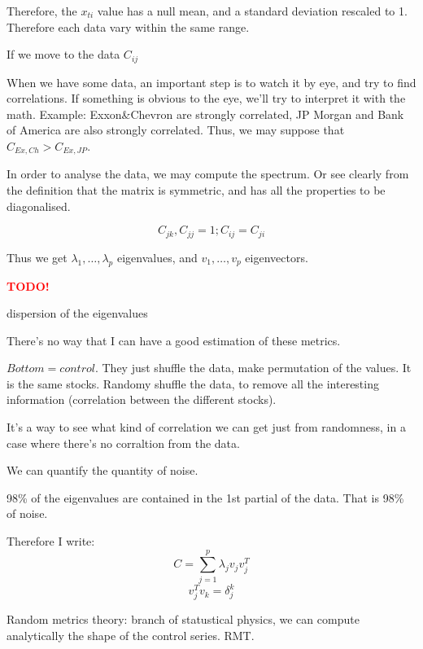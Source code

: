 \documentclass[a4paper]{tufte-book}
\newcommand{\TODO}{\textcolor{red}{\bf TODO!}\xspace}
\begin{document}
Therefore, the $x_{ti}$ value has a null mean, and a standard deviation rescaled to 1. Therefore each data vary within the same range.

If we move to the data $C_{ij}$

When we have some data, an important step is to watch it by eye, and try to find correlations.
If something is obvious to the eye, we’ll try to interpret it with the math. Example: Exxon\&Chevron are strongly correlated, JP Morgan and Bank of America are also strongly correlated.
Thus, we may suppose that $C_{Ex,Ch} > C_{Ex,JP}$.

In order to analyse the data, we may compute the spectrum. Or see clearly from the definition that the matrix is symmetric, and has all the properties to be diagonalised.

\begin{equation}
C_{jk}, C_{jj} = 1 ; C_{ij} = C_{ji}
\end{equation}

Thus we get $\lambda_1, … , \lambda_p$ eigenvalues, and $v_1, … , v_p$ eigenvectors.

\begin{marginfigure}
\TODO
\caption{dispersion of the eigenvalues}
\label{fig2}
\end{marginfigure}

There’s no way that I can have a good estimation of these metrics.

$Bottom = control$. They just shuffle the data, make permutation of the values. It is the same stocks. Randomy shuffle the data, to remove all the interesting information (correlation between the different stocks).

It’s a way to see what kind of correlation we can get just from randomness, in a case where there’s no corraltion from the data.

We can quantify the quantity of noise.

98\% of the eigenvalues are contained in the 1st partial of the data. That is 98\% of noise.

Therefore I write:
\begin{equation}
C = \sum_{j=1}^p \lambda_j v_j v_j^T
\end{equation} 
\begin{equation}
v_j^T v_k = \delta_j^k
\end{equation}

Random metrics theory: branch of statustical physics, we can compute analytically the shape of the control series. RMT.
\end{document}
